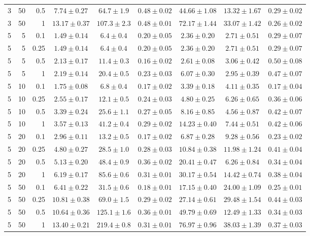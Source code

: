 \begin{table}[htbp]
\begin{tabular}{@{}rrrcccccc@{}}
3 & 50 & 0.5 & $7.74 \pm 0.27$ & $64.7 \pm 1.9$ & $0.48 \pm 0.02$ & $44.66 \pm 1.08$ & $13.32 \pm 1.67$ & $0.29 \pm 0.02$ \\
3 & 50 & 1 & $13.17 \pm 0.37$ & $107.3 \pm 2.3$ & $0.48 \pm 0.01$ & $72.17 \pm 1.44$ & $33.07 \pm 1.42$ & $0.26 \pm 0.02$ \\
\midrule
5 & 5 & 0.1 & $1.49 \pm 0.14$ & $6.4 \pm 0.4$ & $0.20 \pm 0.05$ & $2.36 \pm 0.20$ & $2.71 \pm 0.51$ & $0.29 \pm 0.07$ \\
5 & 5 & 0.25 & $1.49 \pm 0.14$ & $6.4 \pm 0.4$ & $0.20 \pm 0.05$ & $2.36 \pm 0.20$ & $2.71 \pm 0.51$ & $0.29 \pm 0.07$ \\
5 & 5 & 0.5 & $2.13 \pm 0.17$ & $11.4 \pm 0.3$ & $0.16 \pm 0.02$ & $2.61 \pm 0.08$ & $3.06 \pm 0.42$ & $0.50 \pm 0.08$ \\
5 & 5 & 1 & $2.19 \pm 0.14$ & $20.4 \pm 0.5$ & $0.23 \pm 0.03$ & $6.07 \pm 0.30$ & $2.95 \pm 0.39$ & $0.47 \pm 0.07$ \\
5 & 10 & 0.1 & $1.75 \pm 0.08$ & $6.8 \pm 0.4$ & $0.17 \pm 0.02$ & $3.39 \pm 0.18$ & $4.11 \pm 0.35$ & $0.17 \pm 0.04$ \\
5 & 10 & 0.25 & $2.55 \pm 0.17$ & $12.1 \pm 0.5$ & $0.24 \pm 0.03$ & $4.80 \pm 0.25$ & $6.26 \pm 0.65$ & $0.36 \pm 0.06$ \\
5 & 10 & 0.5 & $3.39 \pm 0.24$ & $25.6 \pm 1.1$ & $0.27 \pm 0.05$ & $8.16 \pm 0.85$ & $4.56 \pm 0.87$ & $0.42 \pm 0.07$ \\
5 & 10 & 1 & $3.57 \pm 0.13$ & $41.2 \pm 0.4$ & $0.29 \pm 0.02$ & $14.23 \pm 0.40$ & $7.44 \pm 0.51$ & $0.42 \pm 0.06$ \\
5 & 20 & 0.1 & $2.96 \pm 0.11$ & $13.2 \pm 0.5$ & $0.17 \pm 0.02$ & $6.87 \pm 0.28$ & $9.28 \pm 0.56$ & $0.23 \pm 0.02$ \\
5 & 20 & 0.25 & $4.80 \pm 0.27$ & $28.5 \pm 1.0$ & $0.28 \pm 0.03$ & $10.84 \pm 0.38$ & $11.98 \pm 1.24$ & $0.41 \pm 0.04$ \\
5 & 20 & 0.5 & $5.13 \pm 0.20$ & $48.4 \pm 0.9$ & $0.36 \pm 0.02$ & $20.41 \pm 0.47$ & $6.26 \pm 0.84$ & $0.34 \pm 0.04$ \\
5 & 20 & 1 & $6.19 \pm 0.17$ & $85.6 \pm 0.6$ & $0.31 \pm 0.01$ & $30.17 \pm 0.54$ & $14.42 \pm 0.74$ & $0.38 \pm 0.04$ \\
5 & 50 & 0.1 & $6.41 \pm 0.22$ & $31.5 \pm 0.6$ & $0.18 \pm 0.01$ & $17.15 \pm 0.40$ & $24.00 \pm 1.09$ & $0.25 \pm 0.01$ \\
5 & 50 & 0.25 & $10.81 \pm 0.38$ & $69.0 \pm 1.5$ & $0.29 \pm 0.02$ & $27.14 \pm 0.61$ & $29.48 \pm 1.54$ & $0.44 \pm 0.03$ \\
5 & 50 & 0.5 & $10.64 \pm 0.36$ & $125.1 \pm 1.6$ & $0.36 \pm 0.01$ & $49.79 \pm 0.69$ & $12.49 \pm 1.33$ & $0.34 \pm 0.03$ \\
5 & 50 & 1 & $13.40 \pm 0.21$ & $219.4 \pm 0.8$ & $0.31 \pm 0.01$ & $76.97 \pm 0.96$ & $38.03 \pm 1.39$ & $0.37 \pm 0.03$ \\
\bottomrule
\end{tabular}
\end{table}
